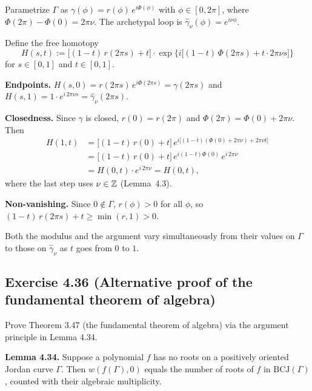 \documentclass{article}
\begin{document}
\begin{solution}
  Parametrize $\Gamma$ as $\gamma(\phi) = r(\phi)\,e^{i\Phi(\phi)}$
  with $\phi \in [0, 2\pi]$, where
  $\Phi(2\pi) - \Phi(0) = 2\pi\nu$.
  The archetypal loop is
  $\hat{\gamma}_\nu(\phi) = e^{i\nu\phi}$.

  Define the free homotopy
  \[
    H(s, t)
    := \bigl[(1-t)\,r(2\pi s) + t\bigr]
    \cdot \exp\bigl\{i\bigl[(1-t)\,\Phi(2\pi s)
    + t \cdot 2\pi\nu s\bigr]\bigr\}
  \]
  for $s \in [0, 1]$ and $t \in [0, 1]$.

  \textbf{Endpoints.}\;
  $H(s, 0) = r(2\pi s)\,e^{i\Phi(2\pi s)} = \gamma(2\pi s)$
  and
  $H(s, 1) = 1 \cdot e^{i\,2\pi\nu s}
  = \hat{\gamma}_\nu(2\pi s)$.

  \textbf{Closedness.}\;
  Since $\gamma$ is closed, $r(0) = r(2\pi)$ and
  $\Phi(2\pi) = \Phi(0) + 2\pi\nu$.
  Then
  \begin{align*}
    H(1, t)
    &= \bigl[(1-t)\,r(0) + t\bigr]\,
       e^{i\bigl[(1-t)(\Phi(0)+2\pi\nu)+2\pi\nu t\bigr]} \\
    &= \bigl[(1-t)\,r(0) + t\bigr]\,
       e^{i(1-t)\Phi(0)}\,e^{i\,2\pi\nu} \\
    &= H(0, t) \cdot e^{i\,2\pi\nu}
    = H(0, t),
  \end{align*}
  where the last step uses $\nu \in \mathbb{Z}$ (Lemma~4.3).

  \textbf{Non-vanishing.}\;
  Since $0 \notin \Gamma$, $r(\phi) > 0$ for all $\phi$,
  so $(1-t)\,r(2\pi s) + t \ge \min(r, 1) > 0$.

  Both the modulus and the argument vary simultaneously
  from their values on $\Gamma$ to those on $\hat{\gamma}_\nu$
  as $t$ goes from $0$ to $1$.\qedhere
\end{solution}

\subsection{Exercise 4.36 (Alternative proof of the fundamental theorem of algebra)}

Prove Theorem 3.47 (the fundamental theorem of algebra) via the argument
principle in Lemma 4.34.

\textbf{Lemma 4.34.}
Suppose a polynomial $f$ has no roots on a positively oriented Jordan
curve $\Gamma$.  Then $w(f(\Gamma), 0)$ equals the number of roots of
$f$ in $\mathrm{BCJ}(\Gamma)$, counted with their algebraic multiplicity.
\end{document}
